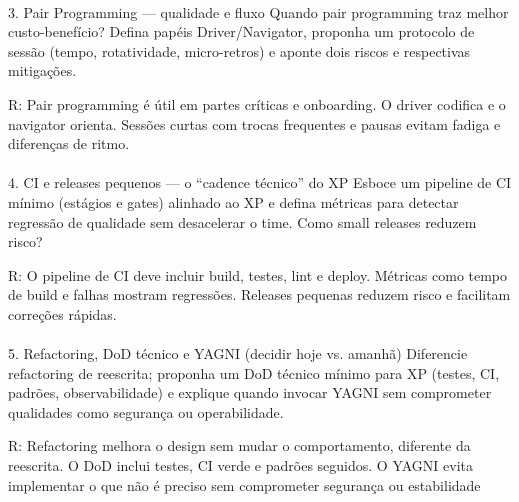 \documentclass[12pt,a4paper]{article}
\begin{document}
\paragraph{}

3. Pair Programming — qualidade e fluxo Quando pair programming traz melhor
custo-benefício? Defina papéis Driver/Navigator, proponha um protocolo de sessão
(tempo, rotatividade, micro-retros) e aponte dois riscos e respectivas mitigações.

R: Pair programming é útil em partes críticas e onboarding. O driver codifica e o navigator
orienta. Sessões curtas com trocas frequentes e pausas evitam fadiga e diferenças de
ritmo.

\paragraph{}

4. CI e releases pequenos — o “cadence técnico” do XP Esboce um pipeline de CI
mínimo (estágios e gates) alinhado ao XP e defina métricas para detectar regressão
de qualidade sem desacelerar o time. Como small releases reduzem risco?

R: O pipeline de CI deve incluir build, testes, lint e deploy. Métricas como tempo de build e
falhas mostram regressões. Releases pequenas reduzem risco e facilitam correções
rápidas.

\paragraph{}

5. Refactoring, DoD técnico e YAGNI (decidir hoje vs. amanhã)
Diferencie refactoring de reescrita; proponha um DoD técnico mínimo para XP (testes,
CI, padrões, observabilidade) e explique quando invocar YAGNI sem comprometer
qualidades como segurança ou operabilidade.

R: Refactoring melhora o design sem mudar o comportamento, diferente da reescrita. O DoD
inclui testes, CI verde e padrões seguidos. O YAGNI evita implementar o que não é preciso
sem comprometer segurança ou estabilidade
\end{document}
